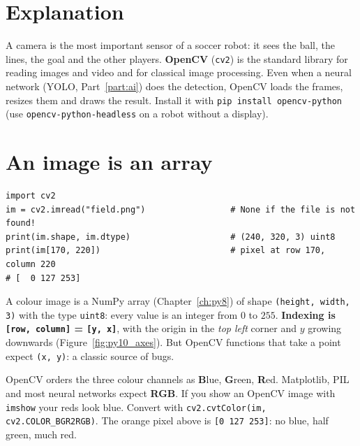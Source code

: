 \label{ch:py10}

\section*{Explanation}
A camera is the most important sensor of a soccer robot: it sees the ball, the lines, the goal and the other players. \textbf{OpenCV} (\texttt{cv2}) is the standard library for reading images and video and for classical image processing. Even when a neural network (YOLO, Part~\ref{part:ai}) does the detection, OpenCV loads the frames, resizes them and draws the result. Install it with \verb!pip install opencv-python! (use \texttt{opencv-python-headless} on a robot without a display).

\section*{An image is an array}
\begin{verbatim}
import cv2
im = cv2.imread("field.png")                 # None if the file is not found!
print(im.shape, im.dtype)                    # (240, 320, 3) uint8
print(im[170, 220])                          # pixel at row 170, column 220
# [  0 127 253]
\end{verbatim}
A colour image is a NumPy array (Chapter~\ref{ch:py8}) of shape \texttt{(height, width, 3)} with the type \texttt{uint8}: every value is an integer from $0$ to $255$. \textbf{Indexing is \texttt{[row, column]} = \texttt{[y, x]}}, with the origin in the \emph{top left} corner and $y$ growing downwards (Figure~\ref{fig:py10_axes}). But OpenCV functions that take a point expect \texttt{(x, y)}: a classic source of bugs.
\begin{center}
\label{fig:py10_axes}
\end{center}
\begin{keyidea}
OpenCV orders the three colour channels as \textbf{B}lue, \textbf{G}reen, \textbf{R}ed. Matplotlib, PIL and most neural networks expect \textbf{RGB}. If you show an OpenCV image with \texttt{imshow} your reds look blue. Convert with \verb!cv2.cvtColor(im, cv2.COLOR_BGR2RGB)!. The orange pixel above is \texttt{[0 127 253]}: no blue, half green, much red.
\end{keyidea}


